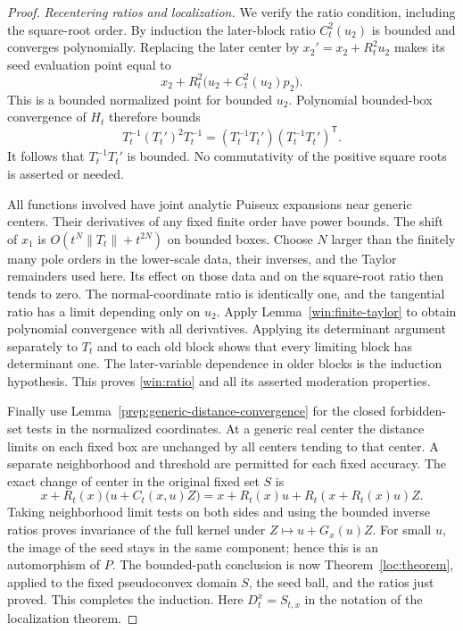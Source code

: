 \begin{proof}
\emph{Recentering ratios and localization.}
We verify the ratio condition, including the square-root order.
By induction the later-block ratio $C_t^2(u_2)$ is bounded and
converges polynomially.  Replacing the later center by
$x_2'=x_2+R_t^2u_2$ makes its seed evaluation point equal to
\[
         x_2+R_t^2\bigl(u_2+C_t^2(u_2)p_2\bigr).
\]
This is a bounded normalized point for bounded $u_2$.
Polynomial bounded-box convergence of $H_t$ therefore bounds
\[
        T_t^{-1}(T_t')^2T_t^{-1}
          =(T_t^{-1}T_t')(T_t^{-1}T_t')^{\mathsf T}.
\]
It follows that $T_t^{-1}T_t'$ is bounded.  No commutativity of the
positive square roots is asserted or needed.

All functions involved have joint analytic Puiseux expansions near
generic centers.  Their derivatives of any fixed finite order
have power bounds.  The shift of $x_1$ is
$O(t^N\|T_t\|+t^{2N})$ on bounded boxes.  Choose $N$ larger than
the finitely many pole orders in the lower-scale data, their
inverses, and the Taylor remainders used here.  Its effect on those
data and on the square-root ratio then tends to zero.  The
normal-coordinate ratio is identically one, and the tangential
ratio has a limit depending only on $u_2$.  Apply
Lemma~\ref{win:finite-taylor} to obtain polynomial convergence with
all derivatives.  Applying its determinant argument separately
to $T_t$ and to each old block shows that every limiting block has
determinant one.  The later-variable dependence in older blocks
is the induction hypothesis.  This proves \eqref{win:ratio} and
all its asserted moderation properties.

Finally use Lemma~\ref{prep:generic-distance-convergence} for the
closed forbidden-set tests in the normalized coordinates.  At a
generic real center the distance limits on each fixed box are
unchanged by all centers tending to that center.  A separate
neighborhood and threshold are permitted for each fixed accuracy.
The exact change of center in the original fixed set $S$ is
\[
 x+R_t(x)\bigl(u+C_t(x,u)Z\bigr)
       =x+R_t(x)u+R_t(x+R_t(x)u)Z.
\]
Taking neighborhood limit tests on both sides and using the
bounded inverse ratios proves invariance of the full kernel
under $Z\mapsto u+G_x(u)Z$.  For small $u$, the image of the seed
stays in the same component; hence this is an automorphism of
$P$.  The bounded-path conclusion is now Theorem~\ref{loc:theorem},
applied to the fixed pseudoconvex domain $S$, the seed
ball, and the ratios just proved.  This completes the induction.
Here $D_t^x=S_{t,x}$ in the notation of the localization theorem.
\end{proof}

